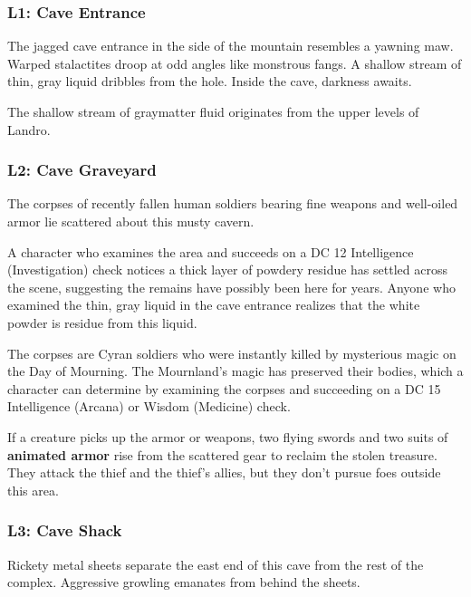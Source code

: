 \documentclass[10pt,a4paper,twoside,bg=print,twocolumn,openany,nodeprecatedcode]{dndbook}
\begin{document}
\subsubsection{L1: Cave Entrance}
\begin{DndReadAloud}{}
The jagged cave entrance in the side of the mountain resembles a yawning maw. Warped stalactites droop at odd angles like monstrous fangs. A shallow stream of thin, gray liquid dribbles from the hole. Inside the cave, darkness awaits.

\end{DndReadAloud}

The shallow stream of graymatter fluid originates from the upper levels of Landro.

\subsubsection{L2: Cave Graveyard}
\begin{DndReadAloud}{}
The corpses of recently fallen human soldiers bearing fine weapons and well-oiled armor lie scattered about this musty cavern.

\end{DndReadAloud}

A character who examines the area and succeeds on a DC 12 Intelligence (Investigation) check notices a thick layer of powdery residue has settled across the scene, suggesting the remains have possibly been here for years. Anyone who examined the thin, gray liquid in the cave entrance realizes that the white powder is residue from this liquid.

The corpses are Cyran soldiers who were instantly killed by mysterious magic on the Day of Mourning. The Mournland's magic has preserved their bodies, which a character can determine by examining the corpses and succeeding on a DC 15 Intelligence (Arcana) or Wisdom (Medicine) check.

If a creature picks up the armor or weapons, two flying swords and two suits of \textbf{animated armor} rise from the scattered gear to reclaim the stolen treasure. They attack the thief and the thief's allies, but they don't pursue foes outside this area.

\subsubsection{L3: Cave Shack}
\begin{DndReadAloud}{}
Rickety metal sheets separate the east end of this cave from the rest of the complex. Aggressive growling emanates from behind the sheets.

\end{DndReadAloud}
\end{document}
